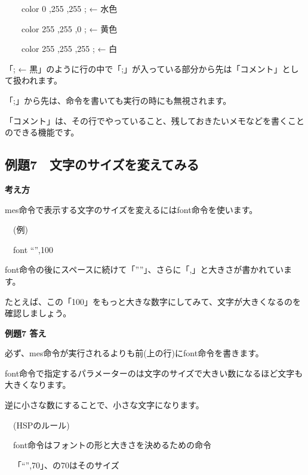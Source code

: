 \documentclass[a4paper,12pt]{jarticle}
\begin{document}
\ \ \ \ color 0 ,255 ,255 ; ← 水色 

\ \ \ \ color 255 ,255 ,0 ; ← 黄色 

\ \ \ \ color 255 ,255 ,255 ; ← 白 


\bigskip
\bigskip

「; ← 黒」のように行の中で「;」が入っている部分から先は「コメント」として扱われます。

「;」から先は、命令を書いても実行の時にも無視されます。

「コメント」は、その行でやっていること、残しておきたいメモなどを書くことのできる機能です。

\bigskip
\bigskip



\clearpage
\subsection{例題7　文字のサイズを変えてみる}
\bigskip
\bigskip

{\bfseries
考え方}

\bigskip

mes命令で表示する文字のサイズを変えるにはfont命令を使います。


\bigskip

\ \ (例)

\ \ font “”,100


\bigskip

font命令の後にスペースに続けて「””」、さらに「,」と大きさが書かれています。

たとえば、この「100」をもっと大きな数字にしてみて、文字が大きくなるのを確認しましょう。

\bigskip

\bigskip

{\bfseries
例題7 答え}

\bigskip

必ず、mes命令が実行されるよりも前(上の行)にfont命令を書きます。

font命令で指定するパラメーターのは文字のサイズで大きい数になるほど文字も大きくなります。

逆に小さな数にすることで、小さな文字になります。


\bigskip

\ \ (HSPのルール)


\bigskip

\ \ font命令はフォントの形と大きさを決めるための命令

\ \ 「“”,70」、の70はそのサイズ


\bigskip
\end{document}
